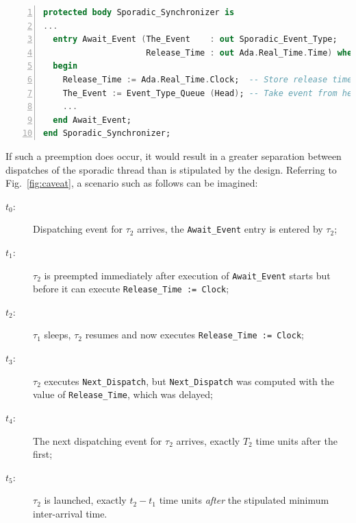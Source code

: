 \begin{lstlisting}[label=lst:caveat,language=ada,numbers=left,caption=Semantic caveat
    in sporadic task release due to non-atomic release and time calculation]
protected body Sporadic_Synchronizer is
...
  entry Await_Event (The_Event    : out Sporadic_Event_Type; 
                     Release_Time : out Ada.Real_Time.Time) when Event_Present is
  begin
    Release_Time := Ada.Real_Time.Clock;  -- Store release time --
    The_Event := Event_Type_Queue (Head); -- Take event from head of event queue --
    ...
  end Await_Event;
end Sporadic_Synchronizer;
\end{lstlisting}

If such a preemption does occur, it would result in a greater
separation between dispatches of the sporadic thread than is
stipulated by the design. Referring to Fig.~\ref{fig:caveat}, a
scenario such as follows can be imagined:

\begin{description}
\item[$t_0$:]{Dispatching event for $\tau_2$ arrives, the
  \texttt{Await\_Event} entry is entered by $\tau_2$;}
\item[$t_1$:]{$\tau_2$ is preempted immediately after execution of
  \texttt{Await\_Event} starts but before it can execute
  \texttt{Release\_Time := Clock};}
\item[$t_2$:]{$\tau_1$ sleeps, $\tau_2$ resumes and now executes
  \texttt{Release\_Time := Clock};}
\item[$t_3$:]{$\tau_2$ executes \texttt{Next\_Dispatch}, but \texttt{Next\_Dispatch} was computed
  with the value of \texttt{Release\_Time}, which was delayed;}
\item[$t_4$:]{The next dispatching event for $\tau_2$ arrives, exactly
  $T_2$ time units after the first;}
\item[$t_5$:]{$\tau_2$ is launched, exactly $t_2 - t_1$ time units
  \emph{after} the stipulated minimum inter-arrival time.}
\end{description}

